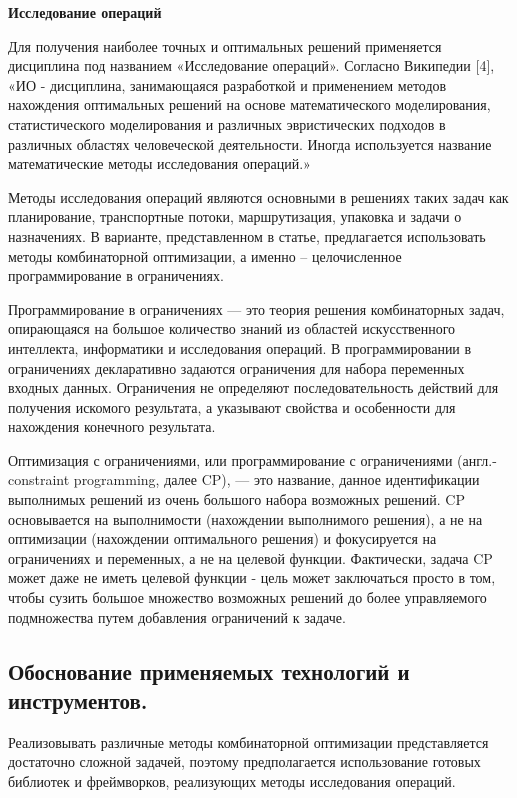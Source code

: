 \textbf{Исследование операций}

Для получения наиболее точных и оптимальных решений применяется дисциплина под названием «Исследование операций». Согласно Википедии [4], «ИО - дисциплина, занимающаяся разработкой и применением методов нахождения оптимальных решений на основе математического моделирования, статистического моделирования и различных эвристических подходов в различных областях человеческой деятельности. Иногда используется название математические методы исследования операций.»

Методы исследования операций являются основными в решениях таких задач как планирование, транспортные потоки, маршрутизация, упаковка и задачи о назначениях. В варианте, представленном в статье, предлагается использовать методы комбинаторной оптимизации, а именно – целочисленное программирование в ограничениях.

Программирование в ограничениях — это теория решения комбинаторных задач, опирающаяся на большое количество знаний из областей искусственного интеллекта, информатики и исследования операций. В программировании в ограничениях декларативно задаются ограничения для набора переменных входных данных. Ограничения не определяют последовательность действий для получения искомого результата, а указывают свойства и особенности для нахождения конечного результата. 

Оптимизация с ограничениями, или программирование с ограничениями (англ.- constraint programming, далее CP), — это название, данное идентификации выполнимых решений из очень большого набора возможных решений. CP основывается на выполнимости (нахождении выполнимого решения), а не на оптимизации (нахождении оптимального решения) и фокусируется на ограничениях и переменных, а не на целевой функции. Фактически, задача CP может даже не иметь целевой функции - цель может заключаться просто в том, чтобы сузить большое множество возможных решений до более управляемого подмножества путем добавления ограничений к задаче.




\subsection{Обоснование применяемых технологий и инструментов.}
Реализовывать различные методы комбинаторной оптимизации представляется достаточно сложной задачей, поэтому предполагается использование готовых библиотек и фреймворков, реализующих методы исследования операций.

